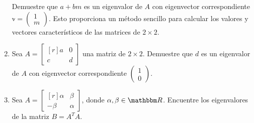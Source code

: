 \begin{enumerate}[resume]
    Demuestre que $a+b m$ es un eigenvalor de $A$ con eigenvector correspondiente $\mathbb{v}=\begin{pmatrix*}1 \\ m\end{pmatrix*}$. Esto proporciona un método sencillo para calcular los valores y vectores característicos de las matrices de $2 \times 2$.
    \item Sea $A=\begin{bmatrix*}[r]a & 0 \\ c & d\end{bmatrix*}$ una matriz de $2 \times 2$. Demuestre que $d$ es un eigenvalor de $A$ con eigenvector correspondiente $\begin{pmatrix*}1 \\ 0\end{pmatrix*}$.\newpage
    \item Sea $A=\begin{bmatrix*}[r]\alpha & \beta \\ -\beta & \alpha\end{bmatrix*}$, donde $\alpha, \beta \in \RR$. Encuentre los eigenvalores de la matriz $B=A^{T} A$.
\end{enumerate}
